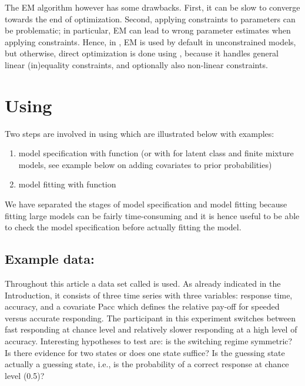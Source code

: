 \documentclass[article]{jss}
\begin{document}
The EM algorithm however has some drawbacks.  First, it can be slow to
converge towards the end of optimization.  Second, applying
constraints to parameters can be problematic; in particular, EM can
lead to wrong parameter estimates when applying constraints.  Hence,
in , EM is used by default in unconstrained models, but
otherwise, direct optimization is done using 
\citep{Tamura2009,Spellucci2002}, because it handles general linear
(in)equality constraints, and optionally also non-linear constraints.




\section[Using depmixS4]{Using }

Two steps are involved in using  which are illustrated
below with examples:
\begin{enumerate}
	\item model specification with function  (or with 
	for latent class and finite mixture models, see example below on adding
	covariates to prior probabilities)
	
	\item  model fitting with function 
\end{enumerate}
We have separated the stages of model specification and model fitting
because fitting large models can be fairly time-consuming and it is
hence useful to be able to check the model specification before
actually fitting the model.

\subsection[Example data: speed]{Example data: }

Throughout this article a data set called  is used.  As
already indicated in the Introduction, it consists of three time
series with three variables: response time, accuracy, and a covariate
Pacc which defines the relative pay-off for speeded versus accurate
responding.  The participant in this experiment switches between fast
responding at chance level and relatively slower responding at a high
level of accuracy.  Interesting hypotheses to test are: is the
switching regime symmetric?  Is there evidence for two states or does
one state suffice?  Is the guessing state actually a guessing state,
i.e., is the probability of a correct response at chance level (0.5)?
\end{document}
